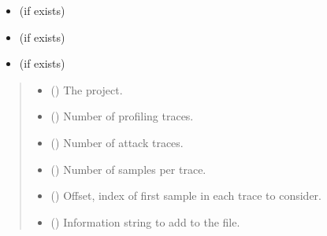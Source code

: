 \documentclass[letterpaper,10pt,english]{sphinxmanual}
\begin{document}
\begin{fulllineitems}
\begin{itemize}
\item {} 
\sphinxAtStartPar
{} (if exists)

\item {} 
\sphinxAtStartPar
{} (if exists)

\item {} 
\sphinxAtStartPar
{} (if exists)

\end{itemize}
\begin{quote}\begin{description}
\begin{itemize}
\item {} 
\sphinxAtStartPar
{} () \textendash{} The project.

\item {} 
\sphinxAtStartPar
{} () \textendash{} Number of profiling traces.

\item {} 
\sphinxAtStartPar
{} () \textendash{} Number of attack traces.

\item {} 
\sphinxAtStartPar
{} (\sphinxstyleliteralemphasis{\sphinxupquote{, }}) \textendash{} Number of samples per trace.

\item {} 
\sphinxAtStartPar
{} (\sphinxstyleliteralemphasis{\sphinxupquote{, }}) \textendash{} Offset, index of first sample in each trace to consider.

\item {} 
\sphinxAtStartPar
{} (\sphinxstyleliteralemphasis{\sphinxupquote{, }}) \textendash{} Information string to add to the file.


\end{itemize}
\end{description}
\end{quote}
\end{fulllineitems}
\end{document}
